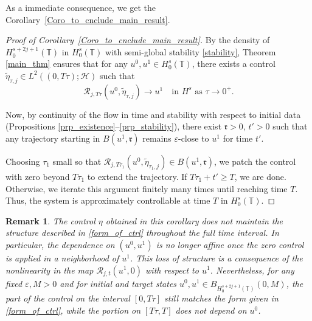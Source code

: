 \documentclass[10pt, reqno]{amsart}
\numberwithin{equation}{section}
\newtheorem{remark}{Remark}
\begin{document}
As a immediate consequence, we get the Corollary~\ref{Coro_to_cnclude_main_result}.
\begin{proof}[Proof of Corollary~\ref{Coro_to_cnclude_main_result}]
	By the density of \( H^{s + 2j + 1}_0(\mathbb{T}) \) in \( H^s_0(\mathbb{T}) \) with semi-global stability \eqref{stability}, Theorem \ref{main_thm} ensures that for any \( u^0, u^1 \in H^s_0(\mathbb{T}) \), there exists a control \( \tilde{\eta}_{\tau, j} \in L^2((0, T\tau); \mathcal{H}) \) such that  
	\[
	\mathcal{R}_{j, T\tau}(u^0, \tilde{\eta}_{\tau, j}) \to u^1 \quad \text{in } H^s \text{ as } \tau \to 0^+.
	\]
	
	Now, by continuity of the flow in time and stability with respect to initial data (Propositions \ref{prp_existence}–\ref{prp_stability}), there exist \( \mathfrak{r} > 0 \), \( t' > 0 \) such that any trajectory starting in \( B(u^1, \mathfrak{r}) \) remains \( \varepsilon \)-close to \( u^1 \) for time \( t' \).
	
	Choosing \( \tau_1 \) small so that \( \mathcal{R}_{j, T\tau_1}(u^0, \tilde{\eta}_{\tau_1, j}) \in B(u^1, \mathfrak{r}) \), we patch the control with zero beyond \( T\tau_1 \) to extend the trajectory. If \( T\tau_1 + t' \geq T \), we are done. Otherwise, we iterate this argument finitely many times until reaching time \( T \). Thus, the system is approximately controllable at time \( T \) in \( H^s_0(\mathbb{T}) \).
\end{proof}








\begin{remark}
	The control \( \eta \) obtained in this corollary does not maintain the structure described in \eqref{form_of_ctrl} throughout the full time interval. In particular, the dependence on \( (u^0, u^1) \) is no longer affine once the zero control is applied in a neighborhood of \( u^1 \). This loss of structure is a consequence of the nonlinearity in the map \( \mathcal{R}_{j, t}(u^1, 0) \) with respect to \( u^1 \). Nevertheless, for any fixed \( \varepsilon, M > 0 \) and for initial and target states \( u^0, u^1 \in B_{H^{s + 2j + 1}_0(\mathbb{T})}(0, M) \), the part of the control on the interval \( [0, T\tau] \) still matches the form given in \eqref{form_of_ctrl}, while the portion on \( [T\tau, T] \) does not depend on \( u^0 \).
\end{remark}
\end{document}
